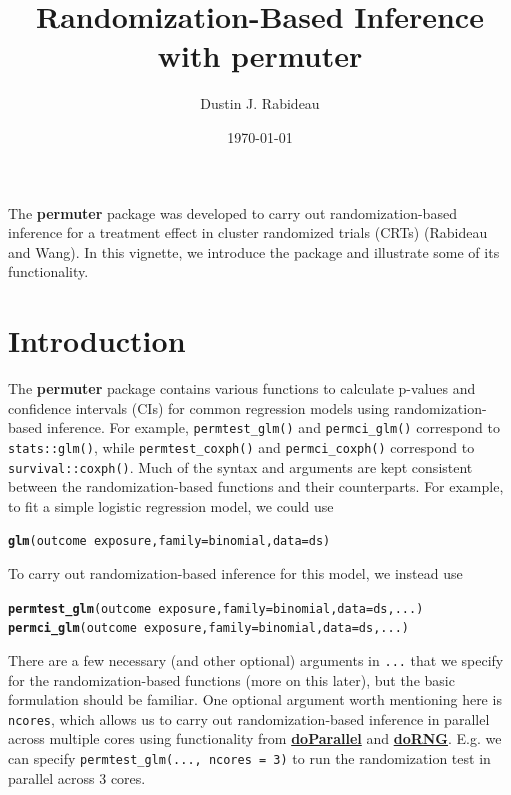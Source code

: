 \documentclass[12pt]{article}\usepackage[]{graphicx}\usepackage[]{color}
\title{Randomization-Based Inference with \textbf{permuter}}
\author{Dustin J. Rabideau}
\date{\today}
\makeatletter
\newcommand{\hlopt}[1]{\textcolor[rgb]{0,0,0}{#1}}%
\newcommand{\hlstd}[1]{\textcolor[rgb]{0.345,0.345,0.345}{#1}}%
\newcommand{\hlkwc}[1]{\textcolor[rgb]{0.333,0.667,0.333}{#1}}%
\newcommand{\hlkwd}[1]{\textcolor[rgb]{0.737,0.353,0.396}{\textbf{#1}}}%
\newenvironment{kframe}{%
 \def\at@end@of@kframe{}%
 \ifinner\ifhmode%
  \def\at@end@of@kframe{\end{minipage}}%
  \begin{minipage}{\columnwidth}%
 \fi\fi%
 \def\FrameCommand##1{\hskip\@totalleftmargin \hskip-\fboxsep
 \colorbox{shadecolor}{##1}\hskip-\fboxsep
     \hskip-\linewidth \hskip-\@totalleftmargin \hskip\columnwidth}%
 \MakeFramed {\advance\hsize-\width
   \@totalleftmargin\z@ \linewidth\hsize
   \@setminipage}}%
 {\par\unskip\endMakeFramed%
 \at@end@of@kframe}
\newenvironment{knitrout}{}{} %
\makeatother
\begin{document}
\maketitle

The \textbf{permuter} package was developed to carry out randomization-based inference for a treatment effect in cluster randomized trials (CRTs) (Rabideau and Wang). In this vignette, we introduce the package and illustrate some of its functionality.

\section{Introduction}
The \textbf{permuter} package contains various functions to calculate p-values and confidence intervals (CIs) for common regression models using randomization-based inference. For example, \texttt{permtest\_glm()} and \texttt{permci\_glm()} correspond to \texttt{stats::glm()}, while \texttt{permtest\_coxph()} and \texttt{permci\_coxph()} correspond to \texttt{survival::coxph()}. Much of the syntax and arguments are kept consistent between the randomization-based functions and their counterparts. For example, to fit a simple logistic regression model, we could use
\begin{knitrout}
\color{fgcolor}\begin{kframe}
\begin{alltt}
\hlkwd{glm}\hlstd{(outcome} \hlopt{~} \hlstd{exposure,} \hlkwc{family} \hlstd{= binomial,} \hlkwc{data} \hlstd{= ds)}
\end{alltt}
\end{kframe}
\end{knitrout}
To carry out randomization-based inference for this model, we instead use
\begin{knitrout}
\color{fgcolor}\begin{kframe}
\begin{alltt}
\hlkwd{permtest_glm}\hlstd{(outcome} \hlopt{~} \hlstd{exposure,} \hlkwc{family} \hlstd{= binomial,} \hlkwc{data} \hlstd{= ds, ...)}
\hlkwd{permci_glm}\hlstd{(outcome} \hlopt{~} \hlstd{exposure,} \hlkwc{family} \hlstd{= binomial,} \hlkwc{data} \hlstd{= ds, ...)}
\end{alltt}
\end{kframe}
\end{knitrout}
There are a few necessary (and other optional) arguments in \texttt{...} that we specify for the randomization-based functions (more on this later), but the basic formulation should be familiar. One optional argument worth mentioning here is \texttt{ncores}, which allows us to carry out randomization-based inference in parallel across multiple cores using functionality from \href{https://cran.r-project.org/web/packages/doParallel/index.html}{\textbf{doParallel}} and \href{https://cran.r-project.org/web/packages/doRNG/index.html}{\textbf{doRNG}}. E.g. we can specify \texttt{permtest\_glm(..., ncores = 3)} to run the randomization test in parallel across 3 cores.
\end{document}
